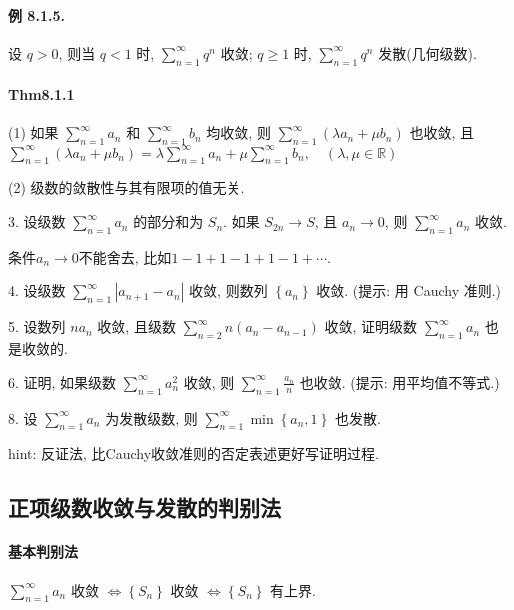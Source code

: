 \paragraph{例 8.1.5. }

设 $q>0$, 则当 $q<1$ 时, $\sum_{n=1}^{\infty}q^{n}$ 收敛; $q\geqslant1$
时, $\sum_{n=1}^{\infty}q^{n}$ 发散(几何级数).

\paragraph{Thm8.1.1}

(1) 如果 $\sum_{n=1}^{\infty}a_{n}$ 和 $\sum_{n=1}^{\infty}b_{n}$ 均收敛,
则 $\sum_{n=1}^{\infty}\left(\lambda a_{n}+\mu b_{n}\right)$ 也收敛,
且 $\sum_{n=1}^{\infty}\left(\lambda a_{n}+\mu b_{n}\right)=\lambda\sum_{n=1}^{\infty}a_{n}+\mu\sum_{n=1}^{\infty}b_{n},\quad(\lambda,\mu\in\mathbb{R})$ 

(2) 级数的敛散性与其有限项的值无关.

3. 设级数 $\sum_{n=1}^{\infty}a_{n}$ 的部分和为 $S_{n}$. 如果 $S_{2n}\rightarrow S$,
且 $a_{n}\rightarrow0$, 则 $\sum_{n=1}^{\infty}a_{n}$ 收敛. 

条件$a_{n}\to0$不能舍去, 比如$1-1+1-1+1-1+\cdots$.

4. 设级数 $\sum_{n=1}^{\infty}\left|a_{n+1}-a_{n}\right|$ 收敛, 则数列 $\left\{ a_{n}\right\} $
收敛. (提示: 用 Cauchy 准则.) 

5. 设数列 $na_{n}$ 收敛, 且级数 $\sum_{n=2}^{\infty}n\left(a_{n}-a_{n-1}\right)$
收敛, 证明级数 $\sum_{n=1}^{\infty}a_{n}$ 也是收敛的. 

6. 证明, 如果级数 $\sum_{n=1}^{\infty}a_{n}^{2}$ 收敛, 则 $\sum_{n=1}^{\infty}\frac{a_{n}}{n}$
也收敛. (提示: 用平均值不等式.)

8. 设 $\sum_{n=1}^{\infty}a_{n}$ 为发散级数, 则 $\sum_{n=1}^{\infty}\min\left\{ a_{n},1\right\} $
也发散.

hint: 反证法, 比Cauchy收敛准则的否定表述更好写证明过程.

\subsection{正项级数收敛与发散的判别法}

\paragraph{基本判别法}

$\sum_{n=1}^{\infty}a_{n}$ 收敛 $\Longleftrightarrow\left\{ S_{n}\right\} $
收敛 $\Longleftrightarrow\left\{ S_{n}\right\} $ 有上界.

